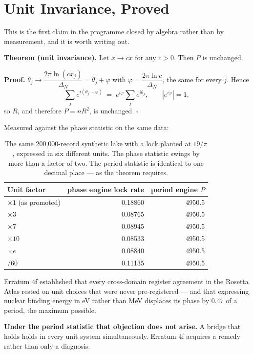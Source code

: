 \documentclass[11pt, letterpaper, openany]{book}
\begin{document}
\section{Unit Invariance, Proved}

This is the first claim in the programme closed by algebra rather than by measurement, and it
is worth writing out.

\begin{signalbox}
\textbf{Theorem (unit invariance).} Let $x \to cx$ for any $c > 0$. Then $P$ is unchanged.

\medskip
\textbf{Proof.} $\theta_j \to \dfrac{2\pi \ln(c x_j)}{\Delta_N} = \theta_j + \varphi$ with
$\varphi = \dfrac{2\pi \ln c}{\Delta_N}$, the same for every $j$. Hence
\[
\sum_j e^{i(\theta_j + \varphi)} \;=\; e^{i\varphi} \sum_j e^{i\theta_j},
\qquad
\left| e^{i\varphi} \right| = 1 ,
\]
so $R$, and therefore $P = nR^2$, is unchanged. $\square$
\end{signalbox}

Measured against the phase statistic on the same data:

\begin{table}[H]
\centering
\small
\begin{tabular}{@{}lrr@{}}
\toprule
\textbf{Unit factor} & \textbf{phase engine lock rate} & \textbf{period engine $P$} \\
\midrule
$\times 1$ (as promoted) & 0.18860 & 4950.5 \\
$\times 3$ & 0.08765 & 4950.5 \\
$\times 7$ & 0.08945 & 4950.5 \\
$\times 10$ & 0.08533 & 4950.5 \\
$\times e$ & 0.08840 & 4950.5 \\
$/60$ & 0.11135 & 4950.5 \\
\bottomrule
\end{tabular}
\caption{The same 200{,}000-record synthetic lake with a lock planted at $19/\pi$, expressed in
six different units. The phase statistic swings by more than a factor of two. The period
statistic is identical to one decimal place --- as the theorem requires.}
\end{table}

\begin{warningbox}
Erratum 4f established that every cross-domain register agreement in the Rosetta Atlas rested on
unit choices that were never pre-registered --- and that expressing nuclear binding energy in eV
rather than MeV displaces its phase by 0.47 of a period, the maximum possible.

\medskip
\noindent \textbf{Under the period statistic that objection does not arise.} A bridge that holds
holds in every unit system simultaneously. Erratum 4f acquires a remedy rather than only a
diagnosis.
\end{warningbox}
\end{document}
